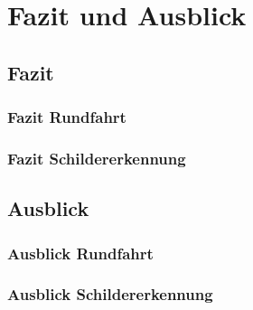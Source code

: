 \section{Fazit und Ausblick}
\label{sec:fazit}
\subsection{Fazit}
\subsubsection{Fazit Rundfahrt}
\subsubsection{Fazit Schildererkennung}
\subsection{Ausblick}
\subsubsection{Ausblick Rundfahrt}
\subsubsection{Ausblick Schildererkennung}